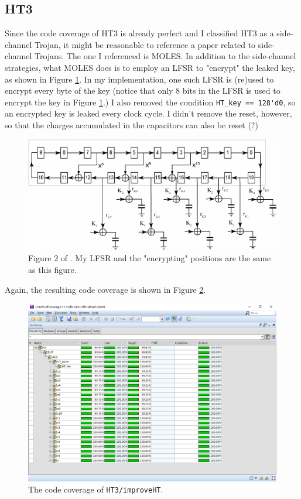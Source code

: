 \documentclass{article}
\begin{document}
\subsection{HT3}

Since the code coverage of HT3 is already perfect and I classified HT3 as a side-channel Trojan, it might be reasonable to reference a paper related to side-channel Trojans. The one I referenced is MOLES. \cite{5361303} In addition to the side-channel strategies, what MOLES does is to employ an LFSR to "encrypt" the leaked key, as shown in Figure \ref{MOLES_LFSR}. In my implementation, one such LFSR is (re)used to encrypt every byte of the key (notice that only 8 bits in the LFSR is used to encrypt the key in Figure \ref{MOLES_LFSR}.) I also removed the condition \verb|HT_key == 128'd0|, so an encrypted key is leaked every clock cycle. I didn't remove the reset, however, so that the charges accumulated in the capacitors can also be reset (?)

\begin{figure}[htp] \centering
\includegraphics[width=\textwidth]{MOLES_LFSR}
\caption{Figure 2 of \cite{5361303}. My LFSR and the "encrypting" positions are the same as this figure.}
\label{MOLES_LFSR}
\end{figure}

Again, the resulting code coverage is shown in Figure \ref{improveHT3}.

\begin{figure}[htp] \centering
\includegraphics[width=\textwidth]{improveHT3}
\caption{The code coverage of \texttt{HT3/improveHT}.}
\label{improveHT3}
\end{figure}
\end{document}
